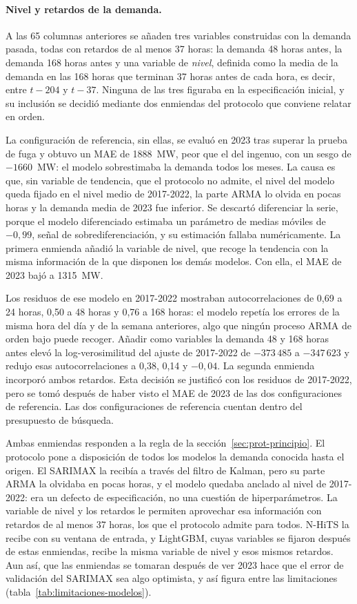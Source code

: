 \paragraph{Nivel y retardos de la demanda.} A las 65 columnas anteriores se
añaden tres variables construidas con la demanda pasada, todas con retardos
de al menos 37 horas: la demanda 48 horas antes, la demanda 168 horas antes
y una variable de \emph{nivel}, definida como la media de la demanda en las
168 horas que terminan 37 horas antes de cada hora, es decir, entre $t-204$ y
$t-37$. Ninguna de las tres figuraba en la especificación inicial, y su
inclusión se decidió mediante dos enmiendas del protocolo que conviene
relatar en orden.

La configuración de referencia, sin ellas, se evaluó en 2023 tras superar la
prueba de fuga y obtuvo un MAE de 1888~MW, peor que el del ingenuo, con un
sesgo de $-1660$~MW: el modelo sobrestimaba la demanda todos los meses. La
causa es que, sin variable de tendencia, que el protocolo no admite, el nivel
del modelo queda fijado en el nivel medio de 2017-2022, la parte ARMA lo olvida en
pocas horas y la demanda media de 2023 fue inferior. Se descartó diferenciar
la serie, porque el modelo diferenciado estimaba un parámetro de medias
móviles de $-0{,}99$, señal de sobrediferenciación, y su estimación fallaba
numéricamente. La primera enmienda añadió la variable de nivel, que recoge
la tendencia con la misma información de la que disponen los demás modelos.
Con ella, el MAE de 2023 bajó a 1315~MW.

Los residuos de ese modelo en 2017-2022 mostraban autocorrelaciones de 0,69
a 24 horas, 0,50 a 48 horas y 0,76 a 168 horas: el modelo repetía los
errores de la misma hora del día y de la semana anteriores, algo que ningún
proceso ARMA de orden bajo puede recoger. Añadir como variables la demanda
48 y 168 horas antes elevó la log-verosimilitud del ajuste de 2017-2022 de
$-373\,485$ a $-347\,623$ y redujo esas autocorrelaciones a 0,38, 0,14 y
$-0{,}04$. La segunda enmienda incorporó ambos retardos. Esta decisión se
justificó con los residuos de 2017-2022, pero se tomó después de haber visto
el MAE de 2023 de las dos configuraciones de referencia. Las
dos configuraciones de referencia cuentan dentro del presupuesto de búsqueda.

Ambas enmiendas responden a la regla de la sección~\ref{sec:prot-principio}.
El protocolo pone a disposición de todos los modelos la demanda conocida hasta
el origen. El SARIMAX la recibía a través del filtro de Kalman, pero su parte
ARMA la olvidaba en pocas horas, y el modelo quedaba anclado al nivel de
2017-2022: era un defecto de especificación, no una cuestión de
hiperparámetros. La variable de nivel y los retardos le permiten aprovechar
esa información con retardos de al menos 37 horas, los que el protocolo
admite para todos. N-HiTS la recibe con su ventana de entrada, y LightGBM,
cuyas variables se fijaron después de estas enmiendas, recibe la misma
variable de nivel y esos mismos retardos. Aun así, que las enmiendas se
tomaran después de ver 2023 hace que el error de validación del SARIMAX sea
algo optimista, y así figura entre las limitaciones
(tabla~\ref{tab:limitaciones-modelos}).

